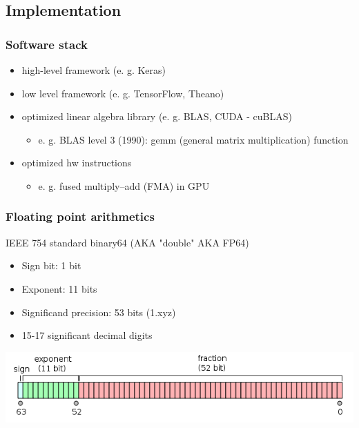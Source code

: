\documentclass{beamer}
\begin{document}
		\subsection{Implementation}
		
			\begin{frame}
				\frametitle{Software stack}
					\begin{itemize}
						\item high-level framework (e. g. Keras)
						\item low level framework (e. g. TensorFlow, Theano)
						\item optimized linear algebra library (e. g. BLAS, CUDA - cuBLAS)
							\begin{itemize}
								\item e. g. BLAS level 3 (1990): gemm (general matrix multiplication) function
							\end{itemize}
						\item optimized hw instructions
							\begin{itemize}
								\item e. g. fused multiply–add (FMA) in GPU
							\end{itemize}
					\end{itemize}			
			\end{frame}
			
			\begin{frame}
				\frametitle{Floating point arithmetics}
				IEEE 754 standard binary64 (AKA "double" AKA FP64)
				\begin{itemize} 
					\item Sign bit: 1 bit
					\item Exponent: 11 bits
					\item Significand precision: 53 bits (1.xyz)
					\item 15-17 significant decimal digits
				\end{itemize}
				\includegraphics[width=\textwidth]{Double_Floating_Point_Format.png}
			\end{frame}
			
\end{document}
